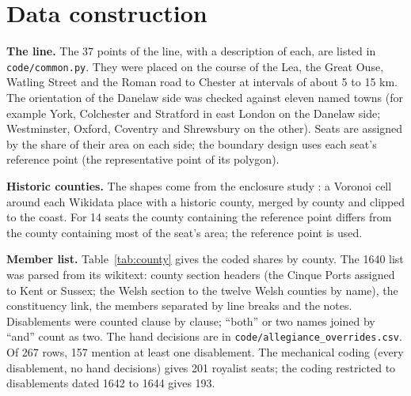 \documentclass[11pt,a4paper]{article}
\begin{document}
\section{Data construction}\label{app:data}
\textbf{The line.} The 37 points of the line, with a description of each, are listed in \texttt{code/common.py}. They were placed on the course of the Lea, the Great Ouse, Watling Street and the Roman road to Chester at intervals of about 5 to 15 km. The orientation of the Danelaw side was checked against eleven named towns (for example York, Colchester and Stratford in east London on the Danelaw side; Westminster, Oxford, Coventry and Shrewsbury on the other). Seats are assigned by the share of their area on each side; the boundary design uses each seat's reference point (the representative point of its polygon).

\textbf{Historic counties.} The shapes come from the enclosure study \citep{hotham2026enc}: a Voronoi cell around each Wikidata place with a historic county, merged by county and clipped to the coast. For 14 seats the county containing the reference point differs from the county containing most of the seat's area; the reference point is used.

\textbf{Member list.} Table~\ref{tab:county} gives the coded shares by county. The 1640 list was parsed from its wikitext: county section headers (the Cinque Ports assigned to Kent or Sussex; the Welsh section to the twelve Welsh counties by name), the constituency link, the members separated by line breaks and the notes. Disablements were counted clause by clause; ``both'' or two names joined by ``and'' count as two. The hand decisions are in \texttt{code/allegiance\_overrides.csv}. Of 267 rows, 157 mention at least one disablement. The mechanical coding (every disablement, no hand decisions) gives 201 royalist seats; the coding restricted to disablements dated 1642 to 1644 gives 193.
\end{document}
